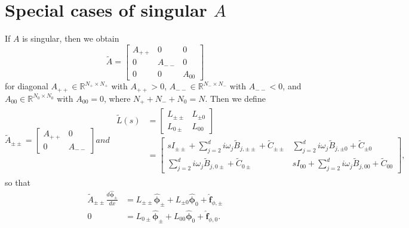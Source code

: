 \section{Special cases of singular $A$}\label{app:singular}

If $A$ is singular, then we obtain
\begin{equation}
    \tilde{A}=\begin{bmatrix}
        A_{++} & 0      & 0\\
        0      & A_{--} & 0\\
        0      & 0      & A_{00}
    \end{bmatrix}
\end{equation}
for diagonal $A_{++}\in\mathbb{R}^{N_+\times N_+}$ with $A_{++}>0$, $A_{--}\in\mathbb{R}^{N_-\times N_-}$ with $A_{--}<0$, and $A_{00}\in\mathbb{R}^{N_0\times N_0}$ with $A_{00}=0$, where $N_++N_-+N_0=N$. Then we define
\begin{subequations}
\begin{equation}
\tilde{A}_{\pm\pm}=\begin{bmatrix}
    A_{++} & 0     \\
    0      & A_{--}
\end{bmatrix}
\end{equation}
and
\begin{align}
\begin{split}
\tilde{L}(s)
&=\begin{bmatrix}
    L_{\pm\pm} & L_{\pm0}\\
    L_{0\pm}   & L_{00}
\end{bmatrix}\\
&=\begin{bmatrix}
    s I_{\pm\pm}+\sum_{j=2}^d i\omega_j\tilde{B}_{j,\pm\pm}+\tilde{C}_{\pm\pm} &
    \sum_{j=2}^d i\omega_j\tilde{B}_{j,\pm0}+\tilde{C}_{\pm0}\\
    \sum_{j=2}^d i\omega_j\tilde{B}_{j,0\pm}+\tilde{C}_{0\pm} &
    s I_{00} + \sum_{j=2}^d i\omega_j\tilde{B}_{j,00}+\tilde{C}_{00}
\end{bmatrix},
\end{split}
\end{align}
\end{subequations}
so that
\begin{subequations}
    \begin{align}
        \tilde{A}_{\pm\pm}\frac{d\hat{\bm{\phi}}_{\pm}}{d x}
        &=L_{\pm\pm}\hat{\bm{\phi}}_{\pm}+L_{\pm0}\hat{\bm{\phi}}_0+\hat{\bm{f}}_{\phi,\pm}\\
        0
        &=L_{0\pm}\hat{\bm{\phi}}_{\pm}+L_{00}\hat{\bm{\phi}}_0+\hat{\bm{f}}_{\phi,0}.
    \end{align}
\end{subequations}

